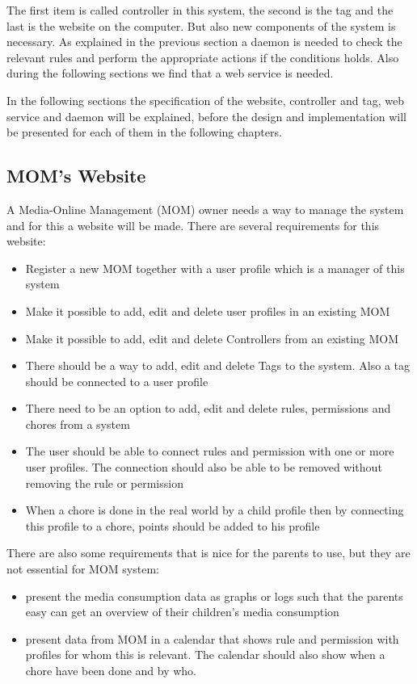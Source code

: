 The first item is called controller in this system, the second is the tag and the last is the website on the computer. But also new components of the system is necessary. As explained in the previous section a daemon is needed to check the relevant rules and perform the appropriate actions if the conditions holds. Also during the following sections we find that a web service is needed. 

In the following sections the specification of the website, controller and tag, web service and daemon will be explained, before the design and implementation will be presented for each of them in the following chapters.  

\subsection{MOM's Website}
A Media-Online Management (MOM) owner needs a way to manage the system and for this a website will be made. There are several requirements for this website:

\begin{itemize}
	\item Register a new MOM together with a user profile which is a manager of this system
	\item Make it possible to add, edit and delete user profiles in an existing MOM 
	\item Make it possible to add, edit and delete Controllers from an existing MOM
	\item There should be a way to add, edit and delete Tags to the system. Also a tag should be connected to a user profile
	\item There need to be an option to add, edit and delete rules, permissions and chores from a system
	\item The user should be able to connect rules and permission with one or more user profiles. The connection should also be able to be removed without removing the rule or permission
	\item When a chore is done in the real world by a child profile then by connecting this profile to a chore, points should be added to his profile
\end{itemize}

There are also some requirements that is nice for the parents to use, but they are not essential for MOM system:

\begin{itemize}
	\item present the media consumption data as graphs or logs such that the parents easy can get an overview of their children's media consumption 
	\item present data from MOM in a calendar that shows rule and permission with profiles for whom this is relevant. The calendar should also show when a chore have been done and by who.
\end{itemize}

